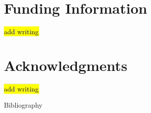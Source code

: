 \documentclass[9pt,twocolumn,twoside]{fernandes_paper}
\begin{document}
\section*{Funding Information}
\hl{add writing}

\section*{Acknowledgments}
\hl{add writing} 





 Bibliography
\nocite{*}


\end{document}
